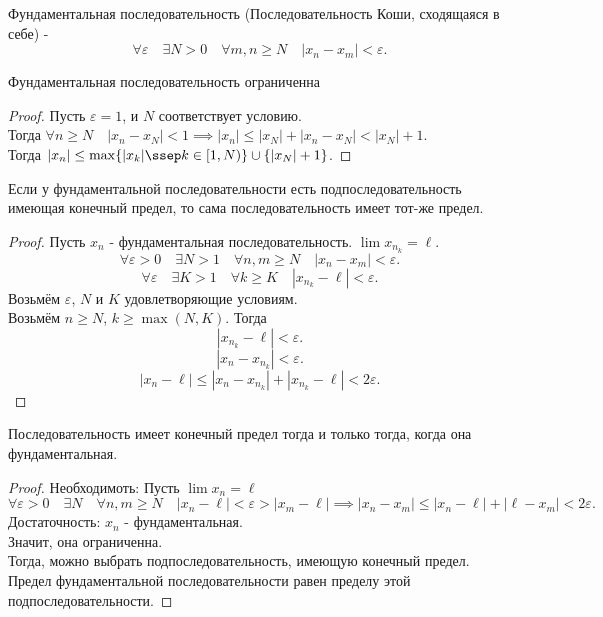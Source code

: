 \documentclass[11pt, oneside]{article}   	%
\begin{document}
    \begin{definition}
        Фундаментальная последовательность (Последовательность Коши, сходящаяся в себе) - 
        \[ \forall{\varepsilon}\quad \exists{N>0}\quad \forall{m,n\ge N}\quad |x_n-x_m|<\varepsilon .\] 
    \end{definition}
    \begin{dlemma}
        Фундаментальная последовательность ограниченна
        \begin{proof}
            Пусть $\varepsilon = 1$, и  $N$ соответствует условию.\\
            Тогда  $\forall{n\ge N}\quad |x_n - x_N| < 1 \implies |x_n| \le |x_N| + |x_n-x_N| < |x_N| + 1$.\\
            Тогда $|x_n| \le \max \{|x_k| \ssep k\in \left[1, N\right)\} \cup \{|x_N| + 1\}  $.
        \end{proof}
    \end{dlemma}
    \begin{dlemma}
        Если у фундаментальной последовательности есть подпоследовательность имеющая конечный предел, то сама последовательность имеет тот-же предел.\\
        \begin{proof}
            Пусть $x_n$ - фундаментальная последовательность. $\lim x_{n_k} = \ell$.
            \[ \forall{\varepsilon>0}\quad \exists{N>1}\quad \forall{n,m\ge N}\quad |x_n-x_m|<\varepsilon .\]
            \[ \forall{\varepsilon}\quad \exists{K>1}\quad \forall{k\ge K}\quad |x_{n_k}-\ell| < \varepsilon .\]
            Возьмём $\varepsilon$, $N$ и $K$ удовлетворяющие условиям.\\
            Возьмём $n\ge N$, $k \ge \max\left( N, K \right) $. Тогда
            \[ |x_{n_k}-\ell| < \varepsilon .\]
            \[ |x_n-x_{n_k}| < \varepsilon .\]
            \[ |x_n-\ell| \le |x_n -x_{n_k}|+|x_{n_k}-\ell| < 2\varepsilon .\] 
        \end{proof}
    \end{dlemma}
    \begin{theorem}
        Последовательность имеет конечный предел тогда и только тогда, когда она фундаментальная.\\
        \begin{proof}
            Необходимоть:
            Пусть $\lim x_n = \ell$
             \[ \forall{\varepsilon>0}\quad \exists{N}\quad \forall{n, m\ge N}\quad |x_n-\ell| < \varepsilon > |x_m-\ell| \implies |x_n-x_m| \le |x_n-\ell|+|\ell-x_m| < 2\varepsilon .\]
            Достаточность:
            $x_n$ - фундаментальная.\\
            Значит, она ограниченна.\\
            Тогда, можно выбрать подпоследовательность, имеющую конечный предел.\\
            Предел фундаментальной последовательности равен пределу этой подпоследовательности.
        \end{proof}
    \end{theorem}
\end{document}
